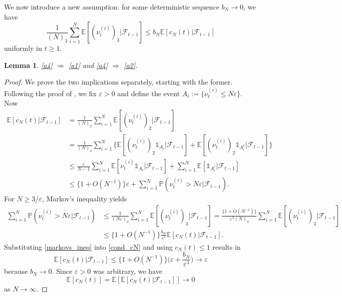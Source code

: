\documentclass[a4paper,11pt]{article}
\newtheorem{lem}{Lemma}
\theoremstyle{definition}
\newcommand{\F}{\mathcal{F}}
\newcommand{\E}{\mathbb{E}}
\newcommand{\1}{\mathds{1}}
\newcommand{\Prob}{\mathbb{P}}
\begin{document}
We now introduce a new assumption: for some  deterministic sequence $b_N \rightarrow 0$, we have
\begin{equation} \label{a4}
\frac{ 1 }{ ( N )_3 } \sum_{ i = 1 }^N \E[ ( \nu_t^{ ( i ) } )_3 | \F_{ t - 1 } ]  \leq b_N \E[ c_N( t ) | \F_{ t - 1 } ]
\end{equation}
uniformly in $t \geq 1$.
\vskip 11pt
\begin{lem}
\eqref{a4} $\Rightarrow$ \eqref{a1} and \eqref{a4} $\Rightarrow$ \eqref{a2}.
\end{lem}
\begin{proof}
We prove the two implications separately, starting with the former.
Following the proof of \cite[Lemma 5.5]{Moehle03}, we fix $\varepsilon > 0$ and define the event $A_i := \{ \nu_t^{ ( i ) } \leq N \varepsilon \}$.
Now
\begin{align}
\E[ c_N( t ) | \F_{ t - 1 } ] &= \frac{ 1 }{ ( N )_2 } \sum_{ i = 1 }^N \E[ ( \nu_t^{ ( i ) } )_2 | \F_{ t - 1 } ] \nonumber \\
&= \frac{ 1 }{ ( N )_2 } \sum_{ i = 1 }^N \Big\{ \E[ ( \nu_t^{ ( i ) } )_2 \mathds{ 1 }_{ A_i } | \F_{ t - 1 } ] + \E[ ( \nu_t^{ ( i ) } )_2 \mathds{ 1 }_{ A_i^c } | \F_{ t - 1 } ] \Big\} \nonumber \\
&\leq \frac{ \varepsilon }{ N - 1 } \sum_{ i = 1 }^N \E[ \nu_t^{ ( i ) } \mathds{ 1 }_{ A_i } | \F_{ t - 1 } ] + \sum_{ i = 1 }^N \E[ \mathds{ 1 }_{ A_i^c } | \F_{ t - 1 } ] \nonumber \\
&\leq \{ 1 + O( N^{ -1 } ) \} \varepsilon + \sum_{ i = 1 }^N \Prob( \nu_t^{ ( i ) } > N \varepsilon | \F_{ t - 1 } ). \label{cond_cN}
\end{align}
For $N \geq 3 / \varepsilon$, Markov's inequality yields
\begin{align}
\sum_{ i = 1 }^N \Prob( \nu_t^{ ( i ) } > N \varepsilon | \F_{ t - 1 } ) &\leq \frac{ 1 }{ ( N \varepsilon )_3 } \sum_{ i = 1 }^N \E[ ( \nu_t^{ ( i ) } )_3 | \F_{ t - 1 } ] = \frac{ \{ 1 + O( N^{ -1 } ) \} }{ \varepsilon^3 ( N )_3 } \sum_{ i = 1 }^N \E[ ( \nu_t^{ ( i ) } )_3 | \F_{ t - 1 } ] \nonumber \\
&\leq \{ 1 + O( N^{ -1 } ) \} \frac{ b_N }{ \varepsilon^3 } \E[ c_N( t ) | \F_{ t - 1 } ]. \label{markovs_ineq}
\end{align}
Substituting \eqref{markovs_ineq} into \eqref{cond_cN} and using $c_N( t ) \leq 1$ results in
\begin{equation*}
\E[ c_N( t ) | \F_{ t - 1 } ] \leq \{ 1 + O( N^{ -1 } ) \} \Bigg( \varepsilon + \frac{ b_N }{ \varepsilon^3 } \Bigg) \rightarrow \varepsilon
\end{equation*}
because $b_N \rightarrow 0$. 
Since $\varepsilon > 0$ was arbitrary, we have
\begin{equation*}
\E[ c_N( t ) ] = \E[ \E[ c_N( t ) | \F_{ t - 1 } ] ] \rightarrow 0
\end{equation*}
as $N \rightarrow \infty$.


\end{proof}
\end{document}
